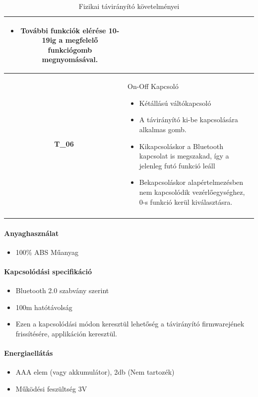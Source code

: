 \documentclass{article}
\begin{document}
\begin{longtable}{|c|p{14cm}|}
       \begin{itemize}
        \item További funkciók elérése 10-19ig a megfelelő funkciógomb megnyomásával. 
        \end{itemize}
       \\\hline
       \textbf{T\_06}  & On-Off Kapcsoló 
       \begin{itemize}
        \item Kétállású váltókapcsoló
        \item A távirányító ki-be kapcsolására alkalmas gomb.
        \item Kikapcsoláskor a Bluetooth kapcsolat is megszakad, így a jelenleg futó funkció leáll
        \item Bekapcsoláskor alapértelmezésben nem kapcsolódik vezérlőegységhez, 0-s funkció kerül kiválasztásra.
        \end{itemize}
       \\\hline
       
\hline
\caption{Fizikai távirányító követelményei}
\end{longtable}
\endgroup

\paragraph{Anyaghasználat}
    \begin{itemize}
        \item 100\% ABS Műanyag
    \end{itemize}


\paragraph{Kapcsolódási specifikáció}
\begin{itemize}
    \item Bluetooth 2.0 szabvány szerint
    \item 100m hatótávolság
    \item Ezen a kapcsolódási módon keresztül lehetőség a távirányító firmwarejének frissítésére, applikáción keresztül.
\end{itemize}

\paragraph{Energiaellátás}
\begin{itemize}
    \item AAA elem (vagy akkumulátor), 2db (Nem tartozék)
    \item Működési feszültség 3V
\end{itemize}
\end{document}
